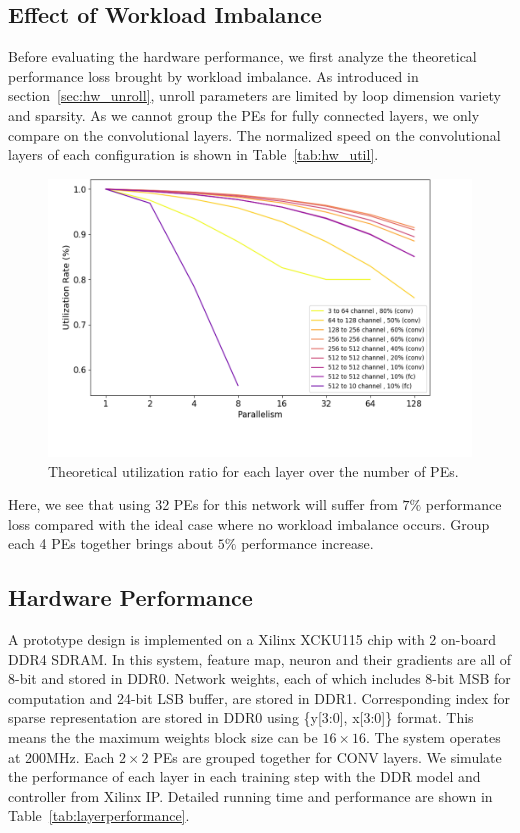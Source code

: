 

\subsection{Effect of Workload Imbalance}\label{sec:exp:imb}

Before evaluating the hardware performance, we first analyze the theoretical performance loss brought by workload imbalance. As introduced in section~\ref{sec:hw_unroll}, unroll parameters are limited by loop dimension variety and sparsity. As we cannot group the PEs for fully connected layers, we only compare on the convolutional layers. The normalized speed on the convolutional layers of each configuration is shown in Table~\ref{tab:hw_util}.



\begin{figure}[tb]
  \centering
  \includegraphics[width=1.0\columnwidth]{figures/util_real.png}
  \caption{Theoretical utilization ratio for each layer over the number of PEs.}
  \label{fig:util_real}
\end{figure}

Here, we see that using 32 PEs for this network will suffer from $7\%$ performance loss compared with the ideal case where no workload imbalance occurs. Group each 4 PEs together brings about $5\%$ performance increase. 


\subsection{Hardware Performance}
A prototype design is implemented on a Xilinx XCKU115 chip with 2 on-board DDR4 SDRAM. In this system, feature map, neuron and their gradients are all of 8-bit and stored in DDR0. Network weights, each of which includes 8-bit MSB for computation and 24-bit LSB buffer, are stored in DDR1. Corresponding index for sparse representation are stored in DDR0 using \{y[3:0], x[3:0]\} format. This means the the maximum weights block size can be $16\times 16$. The system operates at 200MHz. Each $2\times 2$ PEs are grouped together for CONV layers. We simulate the performance of each layer in each training step with the DDR model and controller from Xilinx IP. Detailed running time and performance are shown in Table~\ref{tab:layerperformance}.

